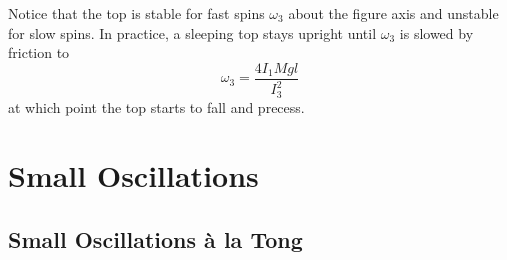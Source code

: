 \documentclass[11pt, a4paper]{article}
\begin{document}
\begin{itemize}
\begin{itemize}
	\end{itemize}
	Notice that the top is stable for fast spins $ \omega_{3} $ about the figure axis and unstable for slow spins. In practice, a sleeping top stays upright until $ \omega_{3} $ is slowed by friction to
	\begin{equation*}
		\omega_{3} = \frac{4I_{1}Mgl}{I_{3}^{2}} 
	\end{equation*}
	at which point the top starts to fall and precess.
	
	
\end{itemize}


\newpage

\section{Small Oscillations}

\subsection{Small Oscillations \`{a} la Tong}
\end{document}
